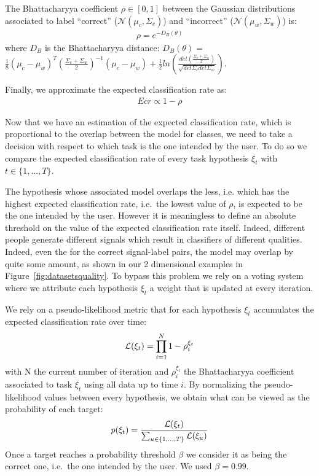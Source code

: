 The Bhattacharyya coefficient $\rho \in [0,1]$ between the Gaussian distributions associated to label ``correct'' ($\mathcal{N}(\mu_c, \Sigma_c)$) and ``incorrect'' ($\mathcal{N}(\mu_w, \Sigma_w)$) is:
%
\begin{eqnarray}
\rho = e^{-D_B(\theta)}
\end{eqnarray}
%
where $D_B$ is the Bhattacharyya distance:
$D_B(\theta)=$\\$\frac{1}{8}(\mu_c-\mu_w)^T(\frac{\Sigma_c+\Sigma_w}{2})^{-1}(\mu_c-\mu_w)+\frac{1}{2}ln\left(\frac{det(\frac{\Sigma_c+\Sigma_w}{2})}{\sqrt{det\Sigma_c det\Sigma_w}}\right)$. 

Finally, we approximate the expected classification rate as:
\begin{eqnarray}
Ecr \propto 1 - \rho
\end{eqnarray}

Now that we have an estimation of the expected classification rate, which is proportional to the overlap between the model for classes, we need to take a decision with respect to which task is the one intended by the user. To do so we compare the expected classification rate of every task hypothesis $\xi_t$ with $t \in \{1, \ldots, T\}$. 

The hypothesis whose associated model overlaps the less, i.e. which has the highest expected classification rate, i.e.\ the lowest value of $\rho$, is expected to be the one intended by the user. However it is meaningless to define an absolute threshold on the value of the expected classification rate itself. Indeed, different people generate different signals which result in classifiers of different qualities. Indeed, even the for the correct signal-label pairs, the model may overlap by quite some amount, as shown in our 2 dimensional examples in Figure~\ref{fig:datasetsquality}. To bypass this problem we rely on a voting system where we attribute each hypothesis $\xi_t$ a weight that is updated at every iteration.

We rely on a pseudo-likelihood metric that for each hypothesis $\xi_t$ accumulates the expected classification rate over time:
%
\begin{eqnarray}
\mathcal{L}(\xi_t) = \prod_{i = 1}^{N} 1 - \rho_i^{\xi_t}
\end{eqnarray}
%
with N the current number of iteration and $\rho_i^{\xi_t}$ the Bhattacharyya coefficient associated to task $\xi_t$ using all data up to time $i$. By normalizing the pseudo-likelihood values between every hypothesis, we obtain what can be viewed as the probability of each target:
%
\begin{eqnarray}
p(\xi_t) = \frac{\mathcal{L}(\xi_t)}{\sum_{u \in \{1, \ldots, T\}} \mathcal{L}(\xi_u)}
\end{eqnarray}
%
Once a target reaches a probability threshold $\beta$ we consider it as being the correct one, i.e.\ the one intended by the user. We used $\beta = 0.99$.



